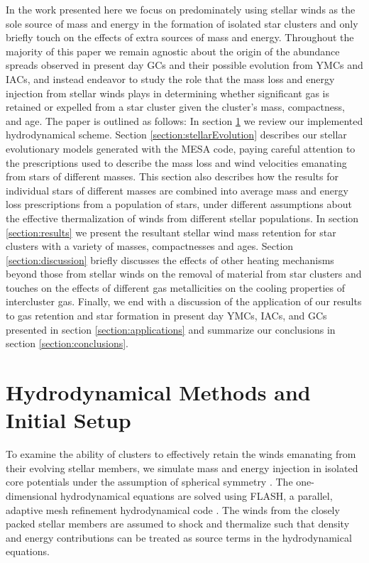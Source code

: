 \documentclass[fleqn,usenatbib]{mnras}
\begin{document}
 In the work presented here we focus on predominately using stellar winds as the sole source of mass and energy in the formation of isolated star clusters and only briefly touch on the effects of extra sources of mass and energy.
 Throughout the majority of this paper we remain agnostic about the origin of the abundance spreads observed in present day GCs and their possible evolution from YMCs and IACs, and instead endeavor to study the role that the mass loss and energy injection from stellar winds plays in determining whether significant gas is retained or expelled from a star cluster given the cluster's mass, compactness, and age.
 The paper is outlined as follows:
 In section \ref{section:hydro} we review our implemented hydrodynamical scheme.  Section \ref{section:stellarEvolution} describes our stellar evolutionary models generated with the MESA \citep{paxton2011} code, paying careful attention to the prescriptions used to describe the mass loss and wind velocities emanating from stars of different masses.  This section also describes how the results for individual stars of different masses are combined into average mass and energy loss prescriptions from a population of stars, under different assumptions about the effective thermalization of winds from different stellar populations.  In section \ref{section:results} we present the resultant stellar wind mass retention for star clusters with a variety of masses, compactnesses and ages.  Section \ref{section:discussion} briefly discusses the effects of other heating mechanisms beyond those from stellar winds on the removal of material from star clusters and touches on the effects of different gas metallicities on the cooling properties of intercluster gas.  Finally, we end with a discussion of the application of our results to gas retention and star formation in present day YMCs, IACs, and GCs presented in section \ref{section:applications} and summarize our conclusions in section \ref{section:conclusions}.





\section{Hydrodynamical Methods and Initial Setup} \label{section:hydro}

 To examine the ability of clusters to effectively retain the winds emanating from their evolving stellar members, we simulate mass and 
energy injection in isolated core potentials under the assumption of spherical symmetry \citep{quad2004,hue2010}.
 The one-dimensional  hydrodynamical equations are solved using 
FLASH, a parallel, adaptive mesh
refinement hydrodynamical code \citep{fryxell2000}. The winds from the closely packed stellar members are assumed to shock and 
thermalize such that  density and energy contributions can be treated as source terms in the hydrodynamical 
equations.  
\end{document}
